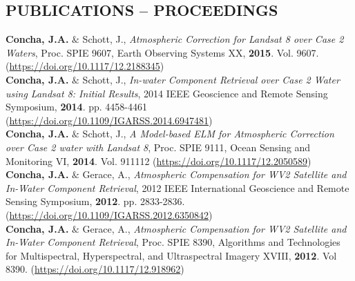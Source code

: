 \documentclass[11pt]{res} %
\begin{document}
\begin{resume}
\section{PUBLICATIONS -- PROCEEDINGS}
\vspace{0.05in}
{\bf Concha, J.A.} $\&$ Schott, J., {\it Atmospheric Correction for Landsat 8 over Case 2 Waters}, Proc. SPIE 9607, Earth Observing Systems XX, {\bf 2015}. Vol. 9607. (\url{https://doi.org/10.1117/12.2188345})
\vspace{0.1in}\\
{\bf Concha, J.A.} $\&$ Schott, J., {\it In-water Component Retrieval over Case 2 Water using Landsat 8: Initial Results}, 2014 IEEE Geoscience and Remote Sensing Symposium, {\bf 2014}. pp. 4458-4461 (\url{https://doi.org/10.1109/IGARSS.2014.6947481})
\vspace{0.1in}\\
{\bf Concha, J.A.} $\&$ Schott, J., {\it A Model-based ELM for Atmospheric Correction over Case 2 water with Landsat 8}, Proc. SPIE 9111, Ocean Sensing and Monitoring VI, {\bf 2014}. Vol. 911112 (\url{https://doi.org/10.1117/12.2050589})
\vspace{0.1in}\\
{\bf Concha, J.A.} $\&$ Gerace, A., {\it Atmospheric Compensation for WV2 Satellite and In-Water Component Retrieval}, 2012 IEEE International Geoscience and Remote Sensing Symposium, {\bf 2012}. pp. 2833-2836. (\url{https://doi.org/10.1109/IGARSS.2012.6350842})
\vspace{0.1in}\\
{\bf Concha, J.A.} $\&$ Gerace, A., {\it Atmospheric Compensation for WV2 Satellite and In-Water Component Retrieval}, Proc. SPIE 8390, Algorithms and Technologies for Multispectral, Hyperspectral, and Ultraspectral Imagery XVIII, {\bf 2012}. Vol 8390. (\url{https://doi.org/10.1117/12.918962})\\

\end{resume}



\end{document}
